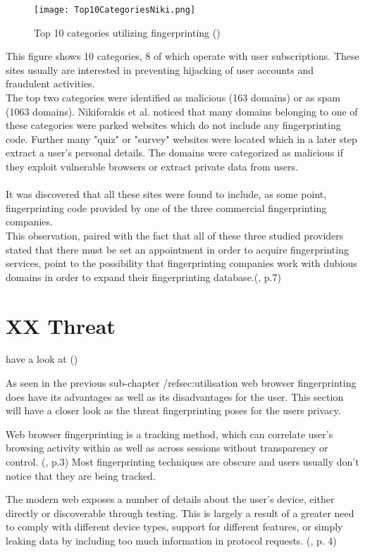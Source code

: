 \begin{figure}[H]
\centering
		\texttt{[image: Top10CategoriesNiki.png]}
		\caption{Top 10 categories utilizing fingerprinting (\textcite{Top10Niki})}
		\label{Top10Niki}
\end{figure}
This figure shows 10 categories, 8 of which operate with user subscriptions. These sites usually are interested in preventing hijacking of user accounts and fraudulent activities.\\
The top two categories were identified as malicious (163 domains) or as spam (1063 domains). Nikiforakis et al. noticed that many domains belonging to one of these categories were parked websites which do not include any fingerprinting code. Further many "quiz" or "survey" websites were located which in a later step extract a user's personal details. The domains were categorized as malicious if they exploit vulnerable browsers or extract private data from users.\\\\
It was discovered that all these sites were found to include, as some point, fingerprinting code provided by one of the three commercial fingerprinting companies.\\
This observation, paired with the fact that all of these three studied providers stated that there must be set an appointment in order to acquire fingerprinting services, point to the possibility that fingerprinting companies work with dubious domains in order to expand their fingerprinting database.(\textcite{nikiforakis13}, p.7)


\section{XX Threat}
have a look at (\textcite{eckersley10})

As seen in the previous sub-chapter /ref{sec:utilisation} web browser fingerprinting does have its advantages as well as its disadvantages for the user. This section will have a closer look as the threat fingerprinting poses for the users privacy.
 
Web browser fingerprinting is a tracking method, which can correlate user's browsing activity within as well as across sessions without transparency or control. (\textcite{doty18}, p.3) Most fingerprinting techniques are obscure and users usually don't notice that they are being tracked.

The modern web exposes a number of details about the user’s device, either directly or discoverable through testing. This is largely a result of a greater need to comply with different device types, support for different features, or simply leaking data by including too much information in protocol requests.
(\textcite{havens16}, p. 4)
 
